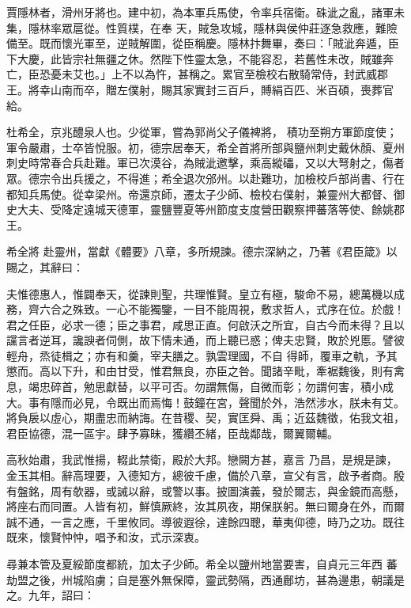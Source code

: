\begin{pinyinscope}
 賈隱林者，滑州牙將也。建中初，為本軍兵馬使，令率兵宿衛。硃泚之亂，諸軍未集，隱林率眾扈從。性質樸，在奉
 天，賊急攻城，隱林與侯仲莊逐急救應，難險備至。既而懷光軍至，逆賊解圍，從臣稱慶。隱林抃舞畢，奏曰：「賊泚奔遁，臣下大慶，此皆宗社無疆之休。然陛下性靈太急，不能容忍，若舊性未改，賊雖奔亡，臣恐憂未艾也。」上不以為忤，甚稱之。累官至檢校右散騎常侍，封武威郡王。將幸山南而卒，贈左僕射，賜其家實封三百戶，賻絹百匹、米百碩，喪葬官給。



 杜希全，京兆醴泉人也。少從軍，嘗為郭尚父子儀裨將，
 積功至朔方軍節度使；軍令嚴肅，士卒皆悅服。初，德宗居奉天，希全首將所部與鹽州刺史戴休顏、夏州刺史時常春合兵赴難。軍已次漠谷，為賊泚邀擊，乘高縱礧，又以大弩射之，傷者眾。德宗令出兵援之，不得進；希全退次邠州。以赴難功，加檢校戶部尚書、行在都知兵馬使。從幸梁州。帝還京師，遷太子少師、檢校右僕射，兼靈州大都督、御史大夫、受降定遠城天德軍，靈鹽豐夏等州節度支度營田觀察押蕃落等使、餘姚郡王。



 希全將
 赴靈州，當獻《體要》八章，多所規諫。德宗深納之，乃著《君臣箴》以賜之，其辭曰：



 夫惟德惠人，惟闢奉天，從諫則聖，共理惟賢。皇立有極，駿命不易，總萬機以成務，齊六合之殊致。一心不能獨鑒，一目不能周視，敷求哲人，式序在位。於戲！君之任臣，必求一德；臣之事君，咸思正直。何啟沃之所宜，自古今而未得？且以讜言者逆耳，讒諛者伺側，故下情未通，而上聽已惑；俾夫忠賢，敗於兇慝。譬彼輕舟，烝徒楫之；亦有和羹，宰夫膳之。孰雲理國，不自
 得師，覆車之軌，予其懲而。高以下升，和由甘受，惟君無良，亦臣之咎。聞諸辛毗，牽裾魏後，則有禽息，竭忠碎首，勉思獻替，以平可否。勿謂無傷，自微而彰；勿謂何害，積小成大。事有隱而必見，令既出而焉悔！鼓鐘在宮，聲聞於外，浩然涉水，朕未有艾。將負扆以虛心，期盡忠而納誨。在昔稷、契，實匡舜、禹；近茲魏徵，佑我文祖，君臣協德，混一區宇。肆予寡昧，獲纘丕緒，臣哉鄰哉，爾翼爾輔。



 高秋始肅，我武惟揚，輟此禁衛，殿於大邦。戀闕方甚，嘉言
 乃昌，是規是諫，金玉其相。辭高理要，入德知方，總彼千慮，備於八章，宣父有言，啟予者商。殷有盤銘，周有欹器，或誡以辭，或警以事。披圖演義，發於爾志，與金鏡而高懸，將座右而同置。人皆有初，鮮慎厥終，汝其夙夜，期保朕躬。無曰爾身在外，而爾誠不通，一言之應，千里攸同。導彼遐徐，達餘四聰，華夷仰德，時乃之功。既往既來，懷賢忡忡，唱予和汝，式示深衷。



 尋兼本管及夏綏節度都統，加太子少師。希全以鹽州地當要害，自貞元三年西
 蕃劫盟之後，州城陷虜；自是塞外無保障，靈武勢隔，西通鄜坊，甚為邊患，朝議是之。九年，詔曰：




\end{pinyinscope}
